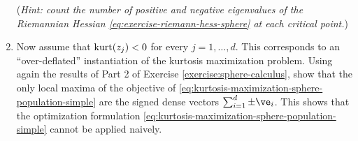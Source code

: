 \documentclass[../../book-main.tex]{subfiles}
\begin{document}
\begin{exercise}
\begin{enumerate}
        (\textit{Hint: count the number of positive and negative eigenvalues of the Riemannian Hessian \eqref{eq:exercise-riemann-hess-sphere} at each critical point.})
        \item Now assume that $\mathop{\mathrm{kurt}}(z_j) < 0$ for every $j =1, \dots, d$. This corresponds to an ``over-deflated'' instantiation of the kurtosis maximization problem. Using again the results of Part 2 of Exercise \ref{exercise:sphere-calculus}, show that the only local maxima of the objective of \eqref{eq:kurtosis-maximization-sphere-population-simple} are the signed dense vectors $\sum_{i=1}^d \pm \ve_i$.
        This shows that the optimization formulation \eqref{eq:kurtosis-maximization-sphere-population-simple} cannot be applied naively.
    \end{enumerate}
\end{exercise}

\begin{exercise}\label{exercise:fast-ica-convergence}
\end{exercise}

\end{document}
